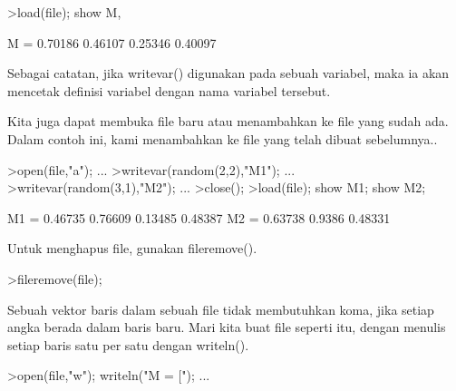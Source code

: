 \documentclass[a4paper,10pt]{article}
\begin{document}
\begin{eulernotebook}
\begin{eulercomment}
\begin{eulercomment}
\begin{eulercomment}
\begin{eulercomment}
\begin{eulercomment}
\begin{eulercomment}
\begin{eulercomment}
\begin{eulercomment}
\begin{eulercomment}
\begin{eulercomment}
\begin{eulercomment}
\begin{eulercomment}
\begin{eulercomment}
\begin{eulercomment}
\begin{eulercomment}
\begin{eulercomment}
\begin{eulercomment}
\begin{eulercomment}
\begin{eulercomment}
\begin{eulercomment}
\begin{eulercomment}
\begin{eulercomment}
\begin{eulercomment}
\begin{eulercomment}
\begin{eulerprompt}
>load(file); show M,
\end{eulerprompt}
\begin{euleroutput}
  M = 
    0.70186   0.46107 
    0.25346   0.40097 
\end{euleroutput}
\begin{eulercomment}
Sebagai catatan, jika writevar() digunakan pada sebuah variabel, maka
ia akan mencetak definisi variabel dengan nama variabel tersebut.
\end{eulercomment}
\begin{eulercomment}
Kita juga dapat membuka file baru atau menambahkan ke file yang sudah
ada. Dalam contoh ini, kami menambahkan ke file yang telah dibuat
sebelumnya..
\end{eulercomment}
\begin{eulerprompt}
>open(file,"a"); ...
>writevar(random(2,2),"M1"); ...
>writevar(random(3,1),"M2"); ...
>close();
>load(file); show M1; show M2;
\end{eulerprompt}
\begin{euleroutput}
  M1 = 
    0.46735   0.76609 
    0.13485   0.48387 
  M2 = 
    0.63738 
     0.9386 
    0.48331 
\end{euleroutput}
\begin{eulercomment}
Untuk menghapus file, gunakan fileremove().
\end{eulercomment}
\begin{eulerprompt}
>fileremove(file);
\end{eulerprompt}
\begin{eulercomment}
Sebuah vektor baris dalam sebuah file tidak membutuhkan koma, jika
setiap angka berada dalam baris baru. Mari kita buat file seperti itu,
dengan menulis setiap baris satu per satu dengan writeln().
\end{eulercomment}
\begin{eulerprompt}
>open(file,"w"); writeln("M = ["); ...

\end{eulerprompt}
\end{eulercomment}
\end{eulercomment}
\end{eulercomment}
\end{eulercomment}
\end{eulercomment}
\end{eulercomment}
\end{eulercomment}
\end{eulercomment}
\end{eulercomment}
\end{eulercomment}
\end{eulercomment}
\end{eulercomment}
\end{eulercomment}
\end{eulercomment}
\end{eulercomment}
\end{eulercomment}
\end{eulercomment}
\end{eulercomment}
\end{eulercomment}
\end{eulercomment}
\end{eulercomment}
\end{eulercomment}
\end{eulercomment}
\end{eulercomment}
\end{eulernotebook}
\end{document}
